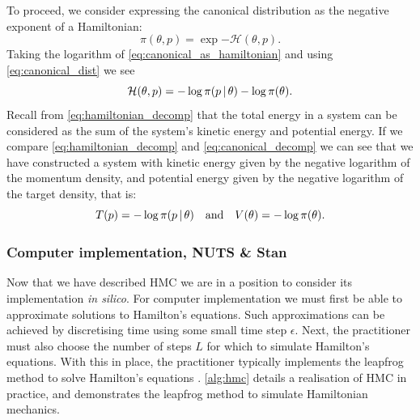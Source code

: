 To proceed, we consider expressing the canonical distribution as the negative
exponent of a Hamiltonian:
\begin{equation}
  \label{eq:canonical_as_hamiltonian}
  \pi(\theta, p) = \exp{-\mathcal{H}(\theta, p)}.
\end{equation}
Taking the logarithm of \cref{eq:canonical_as_hamiltonian} and using
\cref{eq:canonical_dist} we see
\begin{equation}
  \label{eq:canonical_decomp}
  \mathcal{H}(\theta, p) = -\log{\pi(p \,|\,\theta)} - \log{\pi(\theta)}.
\end{equation}
Recall from \cref{eq:hamiltonian_decomp} that the total energy in a system can
be considered as the sum of the system's kinetic energy and potential energy.
If we compare \cref{eq:hamiltonian_decomp} and \cref{eq:canonical_decomp} we
can see that we have constructed a system with kinetic energy given by the
negative logarithm of the momentum density, and potential energy given by the
negative logarithm of the target density, that is:
\begin{equation*}
    T(p) = -\log{\pi(p \,|\,\theta)} \quad\text{and}\quad V(\theta) = -\log{\pi(\theta)}.
\end{equation*}

\subsubsection{Computer implementation, NUTS \& Stan}

Now that we have described HMC we are in a position to consider its
implementation \emph{in silico}. For computer implementation we must first be
able to approximate solutions to Hamilton's equations. Such approximations can
be achieved by discretising time using some small time step $\epsilon$. Next,
the practitioner must also choose the number of steps $L$ for which to simulate
Hamilton's equations. With this in place, the practitioner typically implements
the leapfrog method to solve Hamilton's equations \parencite{neal11}.
\cref{alg:hmc} details a realisation of HMC in practice, and demonstrates the
leapfrog method to simulate Hamiltonian mechanics.

